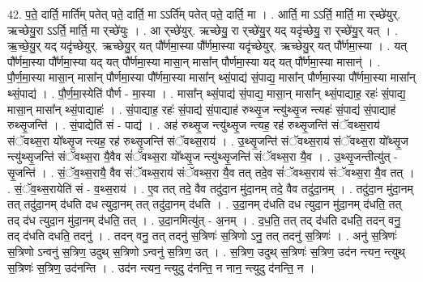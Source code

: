 \documentclass[17pt]{extarticle}
\begin{document}
42. प॒ते॒ दार्ति॒ मार्ति॑म् पतेत् पते॒ दार्ति॒ मा ऽऽर्ति॑म् पतेत् पते॒ दार्ति॒ मा । . आर्ति॒ मा ऽऽर्ति॒ मार्ति॒ मा र्‌च्छे॑युर्. ऋच्छेयु॒रा ऽऽर्ति॒ मार्ति॒ मा र्‌च्छे॑युः । . आ र्‌च्छे॑युर्. ऋच्छेयु॒ रा र्‌च्छे॑यु॒र् यद् यदृ॑च्छेयु॒ रा र्‌च्छे॑यु॒र् यत् । . ऋ॒च्छे॒यु॒र् यद् यदृ॑च्छेयुर्. ऋच्छेयु॒र् यत् पौ᳚र्णमा॒स्या पौ᳚र्णमा॒स्या यदृ॑च्छेयुर्. ऋच्छेयु॒र् यत् पौ᳚र्णमा॒स्या । . यत् पौ᳚र्णमा॒स्या पौ᳚र्णमा॒स्या यद् यत् पौ᳚र्णमा॒स्या मासा॒न् मासा᳚न् पौर्णमा॒स्या यद् यत् पौ᳚र्णमा॒स्या मासान्॑ । . पौ॒र्ण॒मा॒स्या मासा॒न् मासा᳚न् पौर्णमा॒स्या पौ᳚र्णमा॒स्या मासा᳚न् थ्सं॒पाद्य॑ सं॒पाद्य॒ मासा᳚न् पौर्णमा॒स्या पौ᳚र्णमा॒स्या मासा᳚न् थ्सं॒पाद्य॑ । . पौ॒र्ण॒मा॒स्येति॑ पौर्ण - मा॒स्या । . मासा᳚न् थ्सं॒पाद्य॑ सं॒पाद्य॒ मासा॒न् मासा᳚न् थ्सं॒पाद्याह॒ रहः॑ सं॒पाद्य॒ मासा॒न् मासा᳚न् थ्सं॒पाद्याहः॑ । . सं॒पाद्याह॒ रहः॑ सं॒पाद्य॑ सं॒पाद्याह॑ रुथ्सृ॒ज न्त्यु॑थ्सृ॒ज न्त्यहः॑ सं॒पाद्य॑ सं॒पाद्याह॑ रुथ्सृ॒जन्ति॑ । . सं॒पाद्येति॑ सं - पाद्य॑ । . अह॑ रुथ्सृ॒ज न्त्यु॑थ्सृ॒ज न्त्यह॒ रह॑ रुथ्सृ॒जन्ति॑ संॅवथ्स॒राय॑ संॅवथ्स॒रा यो᳚थ्सृ॒ज न्त्यह॒ रह॑ रुथ्सृ॒जन्ति॑ संॅवथ्स॒राय॑ । . उ॒थ्सृ॒जन्ति॑ संॅवथ्स॒राय॑ संॅवथ्स॒रा यो᳚थ्सृ॒ज न्त्यु॑थ्सृ॒जन्ति॑ संॅवथ्स॒रा यै॒वैव सं॑ॅवथ्स॒रा यो᳚थ्सृ॒ज न्त्यु॑थ्सृ॒जन्ति॑ संॅवथ्स॒रा यै॒व । . उ॒थ्सृ॒जन्तीत्यु॑त् - सृ॒जन्ति॑ । . सं॒ॅव॒थ्स॒रायै॒ वैव सं॑ॅवथ्स॒राय॑ संॅवथ्स॒रा यै॒व तत् तदे॒व सं॑ॅवथ्स॒राय॑ संॅवथ्स॒रा यै॒व तत् । . सं॒ॅव॒थ्स॒रायेति॑ सं - व॒थ्स॒राय॑ । . ए॒व तत् तदे॒ वैव तदु॑दा॒न मु॑दा॒नम् तदे॒ वैव तदु॑दा॒नम् । . तदु॑दा॒न मु॑दा॒नम् तत् तदु॑दा॒नम् द॑धति दध त्युदा॒नम् तत् तदु॑दा॒नम् द॑धति । . उ॒दा॒नम् द॑धति दध त्युदा॒न मु॑दा॒नम् द॑धति॒ तत् तद् द॑ध त्युदा॒न मु॑दा॒नम् द॑धति॒ तत् । . उ॒दा॒नमित्यु॑त् - अ॒नम् । . द॒ध॒ति॒ तत् तद् द॑धति दधति॒ तदन् वनु॒ तद् द॑धति दधति॒ तदनु॑ । . तदन् वनु॒ तत् तदनु॑ स॒त्रिणः॑ स॒त्रिणो ऽनु॒ तत् तदनु॑ स॒त्रिणः॑ । . अनु॑ स॒त्रिणः॑ स॒त्रिणो ऽन्वनु॑ स॒त्रिण॒ उदुथ् स॒त्रिणो ऽन्वनु॑ स॒त्रिण॒ उत् । . स॒त्रिण॒ उदुथ् स॒त्रिणः॑ स॒त्रिण॒ उद॑न न्त्यन॒ न्त्युथ् स॒त्रिणः॑ स॒त्रिण॒ उद॑नन्ति । . उद॑न न्त्यन॒ न्त्युदु द॑नन्ति॒ न नान॒ न्त्युदु द॑नन्ति॒ न । \newline
\pagebreak
{}
\end{document}
